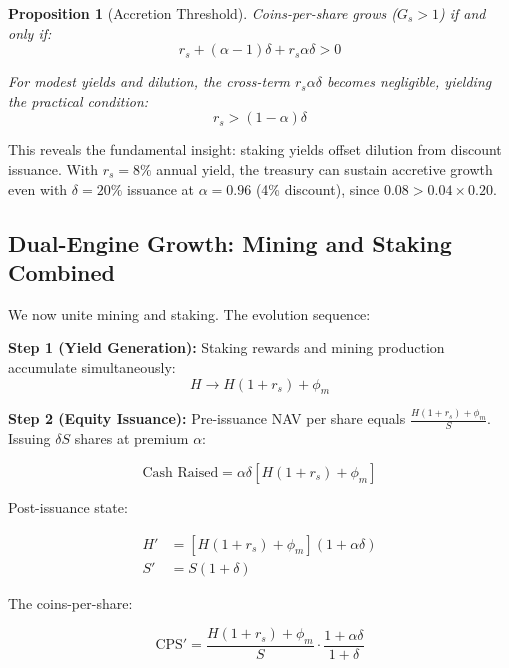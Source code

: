 \documentclass[
  journal=medium,
  manuscript=article-type,
  year=2025,
  volume=1,
]{cup-journal}
\newtheorem{proposition}[theorem]{Proposition}
\theoremstyle{definition}
\begin{document}
\begin{proposition}[Accretion Threshold]
Coins-per-share grows ($G_s > 1$) if and only if:
\begin{equation}
r_s + (\alpha - 1)\delta + r_s \alpha \delta > 0
\end{equation}

For modest yields and dilution, the cross-term $r_s \alpha \delta$ becomes negligible, yielding the practical condition:
\begin{equation}
r_s > (1 - \alpha)\delta
\end{equation}
\end{proposition}

This reveals the fundamental insight: staking yields offset dilution from discount issuance. With $r_s = 8\%$ annual yield, the treasury can sustain accretive growth even with $\delta = 20\%$ issuance at $\alpha = 0.96$ (4\% discount), since $0.08 > 0.04 \times 0.20$.

\subsection{Dual-Engine Growth: Mining and Staking Combined}

We now unite mining and staking. The evolution sequence:

\textbf{Step 1 (Yield Generation):} Staking rewards and mining production accumulate simultaneously:
\begin{equation}
H \to H(1 + r_s) + \phi_m
\end{equation}

\textbf{Step 2 (Equity Issuance):} Pre-issuance NAV per share equals $\frac{H(1+r_s) + \phi_m}{S}$. Issuing $\delta S$ shares at premium $\alpha$:

\begin{equation}
\text{Cash Raised} = \alpha \delta [H(1 + r_s) + \phi_m]
\end{equation}

Post-issuance state:

\begin{align}
H' &= [H(1 + r_s) + \phi_m](1 + \alpha\delta) \\
S' &= S(1 + \delta)
\end{align}

The coins-per-share:

\begin{equation}
\text{CPS}' = \frac{H(1 + r_s) + \phi_m}{S} \cdot \frac{1 + \alpha\delta}{1 + \delta}
\end{equation}
\end{document}
